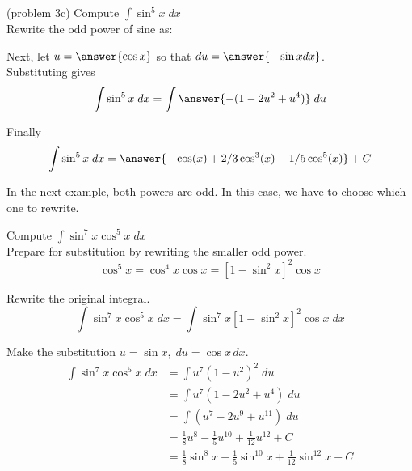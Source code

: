 \documentclass[handout]{ximera}
\begin{document}
\begin{problem}{\color{gray}(problem 3c)} 
Compute $\displaystyle{\int \sin^5 x \; dx}$\\

Rewrite the odd power of sine as:

\begin{multipleChoice}
\end{multipleChoice}

Next, let $u = \answer{\cos x}$ so that $du = \answer{-\sin x dx}$.\\

Substituting gives
\[
\int \sin^5 x \; dx= \int \answer{-(1-2u^2 + u^4)} \; du
\]

Finally
\[
\int \sin^5 x \; dx= \answer{- \cos(x) + 2/3 \cos^3(x) - 1/5 \cos^5(x)} + C
\]

\end{problem}

In the next example, both powers are odd.  In this case, we have to choose which one to rewrite.



\begin{example}[example 4]
Compute $\displaystyle{\int \sin^7 x\cos^5 x \; dx}$\\

Prepare for substitution by rewriting the smaller odd power.
\[
\cos^5 x = \cos^4 x \cos x = \left[1-\sin^2 x\right]^2 \cos x
\]

Rewrite the original integral.
\[
\int \sin^7 x\cos^5 x \; dx = \int \sin^7 x\left[1 - \sin^2 x\right]^2 \cos x \; dx
\]

Make the substitution $u = \sin x, \; du = \cos x \, dx$.
\begin{align*}
\int \sin^7 x\cos^5 x \; dx  &= \int u^7 (1-u^2)^2 \; du\\
   &= \int u^7(1 - 2u^2 + u^4) \; du\\
   &= \int (u^7 - 2u^9 + u^{11}) \; du\\
  &= \tfrac18 u^8 - \tfrac15 u^{10} + \tfrac{1}{12}u^{12}+ C \\
  &= \tfrac18 \sin^8 x - \tfrac15 \sin^{10} x + \tfrac{1}{12} \sin^{12} x+ C
\end{align*}

\end{example}
\end{document}
